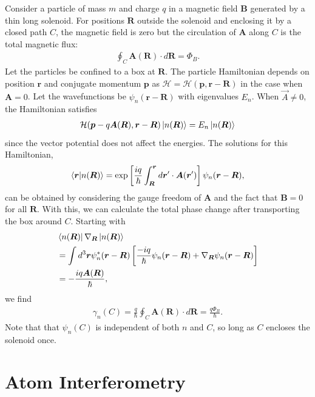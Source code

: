 \documentclass[reprint,
nofootinbib,
amsmath,amssymb,
aps]{revtex4-1}
\newcommand{\f}[2]{\frac{#1}{#2}}
\newcommand{\lb}{\left[}
\newcommand{\rb}{\right]}
\begin{document}
Consider a particle of mass $m$ and charge $q$ in a magnetic field $\bm{B}$ generated by a thin long solenoid. For positions $\bm{R}$ outside the solenoid and enclosing it by a closed path $C$, the magnetic field is zero but the circulation of $\bm{A}$ along $C$ is the total magnetic flux:
\begin{align*}
\oint_C \bm{A}(\bm{R}) \cdot d\bm{R} = \Phi_B.
\end{align*}
Let the particles be confined to a box at $\bm{R}$. The particle Hamiltonian depends on position ${\bm{r}}$ and conjugate momentum $\bm{p}$ as $\mathcal{H} = \mathcal{H}(\bm{p}, \bm{r} - \bm{R})$ in the case when $\bm{A} = 0$. Let the wavefunctions be $\psi_n(\bm{r} - \bm{R})$ with eigenvalues $E_n$.  When $\vec{A} \neq 0$, the Hamiltonian satisfies
\begin{align*}
\mathcal{H}(\bm{p}-q\bm{A}(\bm{R}), \bm{r}- \bm{R}) \ket{n(\bm{R})} = E_n \ket{n(\bm{R})}
\end{align*}
since the vector potential does not affect the energies. The solutions for this Hamiltonian,
\begin{align*}
\bra{\bm{r}} \ket{n(\bm{R})} = \exp\lb \f{iq}{\hbar} \int_{\bm{R}}^{\bm{r}} d\bm{r}'\cdot \bm{A}(\bm{r}') \rb \psi_n(\bm{r} - \bm{R}),
\end{align*}
can be obtained by considering the gauge freedom of $\bm{A}$ and the fact that $\bm{B}=0$ for all $\bm{R}$. With this, we can calculate the total phase change after transporting the box around $C$. Starting with
\begin{align*}
&\bra{n(\bm{R})} \nabla_{\bm{R}} \ket{n(\bm{R})}\\
&= \int d^3\bm{r}\psi^*_n(\bm{r} - \bm{R}) \lb \f{-iq}{\hbar}\psi_n(\bm{r} - \bm{R}) + \nabla_{\bm{R}} \psi_n(\bm{r} - \bm{R}) \rb\\
&= -\f{iq\bm{A}(\bm{R})}{\hbar},
\end{align*}
we find 
\begin{align*}
\gamma_n(C) = \f{q}{\hbar}\oint_C \bm{A}(\bm{R}) \cdot d\bm{R} = \f{q\Phi_B}{\hbar}.
\end{align*}
Note that that $\psi_n(C)$ is independent of both $n$ and $C$, so long as $C$ encloses the solenoid once.



\section{Atom Interferometry} \label{sect:atom}
\end{document}
